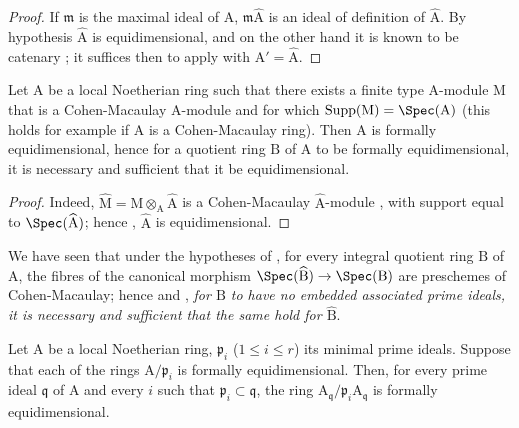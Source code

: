 \begin{proof}
If $\mathfrak{m}$ is the maximal ideal of $\mathrm{A}$, $\mathfrak{m}\widehat{\mathrm{A}}$ is an ideal of definition of $\widehat{\mathrm{A}}$.
By hypothesis $\widehat{\mathrm{A}}$ is equidimensional, and on the other hand it is known to be catenary ; it suffices then to apply  with $\mathrm{A}'=\widehat{\mathrm{A}}$.
\end{proof}

\begin{corollary}[7.1.5]
\label{IV.7.1.5}
Let $\mathrm{A}$ be a local Noetherian ring such that there exists a finite type $\mathrm{A}$-module $\mathrm{M}$ that is a Cohen-Macaulay $\mathrm{A}$-module and for which $\operatorname{Supp}(\mathrm{M})=\Spec(\mathrm{A})$ (this holds for example if $\mathrm{A}$ is a Cohen-Macaulay ring).
Then $\mathrm{A}$ is formally equidimensional, hence  for a quotient ring $\mathrm{B}$ of $\mathrm{A}$ to be formally equidimensional, it is necessary and sufficient that it be equidimensional.
\end{corollary}

\begin{proof}
Indeed, $\widehat{\mathrm{M}}=\mathrm{M}\otimes_\mathrm{A}\widehat{\mathrm{A}}$ is a Cohen-Macaulay $\widehat{\mathrm{A}}$-module , with support equal to $\Spec(\widehat{\mathrm{A}})$; hence , $\widehat{\mathrm{A}}$ is equidimensional.
\end{proof}

\begin{remark}[7.1.6]
\label{IV.7.1.6}
We have seen  that under the hypotheses of , for every integral quotient ring $\mathrm{B}$ of $\mathrm{A}$, the fibres of the canonical morphism $\Spec(\widehat{\mathrm{B}})\to\Spec(\mathrm{B})$ are preschemes of Cohen-Macaulay; hence  and , \emph{for $\mathrm{B}$ to have no embedded associated prime ideals, it is necessary and sufficient that the same hold for $\widehat{\mathrm{B}}$}.
\end{remark}

\begin{lemma}[7.1.7]
\label{IV.7.1.7}
Let $\mathrm{A}$ be a local Noetherian ring, $\mathfrak{p}_i$ ($1\leqslant i\leqslant r$) its minimal prime ideals.
Suppose that each of the rings $\mathrm{A}/\mathfrak{p}_i$ is formally equidimensional.
Then, for every prime ideal $\mathfrak{q}$ of $\mathrm{A}$ and every $i$ such that $\mathfrak{p}_i\subset\mathfrak{q}$, the ring $\mathrm{A}_\mathfrak{q}/\mathfrak{p}_i\mathrm{A}_\mathfrak{q}$ is formally equidimensional.
\end{lemma}

